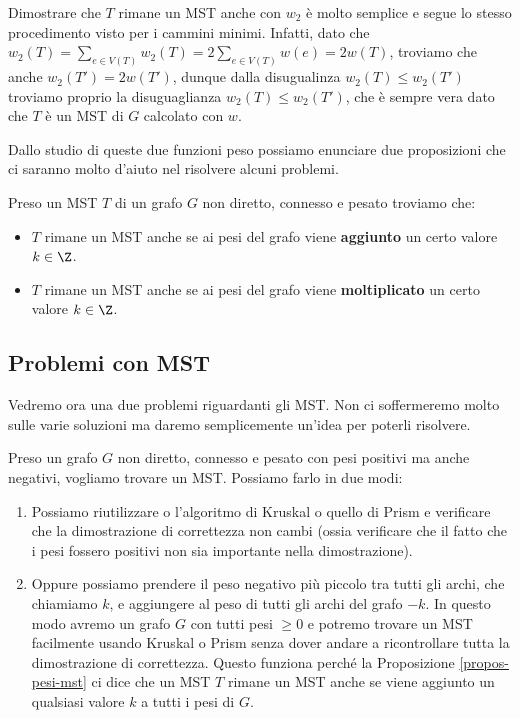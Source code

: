\documentclass[11pt, a4paper, titlepage, oneside]{scrbook}
\begin{document}
Dimostrare che $T$ rimane un MST anche con $w_2$ è molto semplice e segue lo stesso procedimento visto per i cammini minimi. Infatti, dato che $w_2(T) = \sum_{e \in V(T)} w_2(T) = 2 \sum_{e \in V(T)} w(e) = 2 w(T)$, troviamo che anche $w_2(T') = 2 w(T')$, dunque dalla disugualinza $w_2(T) \leq w_2(T')$ troviamo proprio la disuguaglianza $w_2(T) \leq w_2(T')$, che è sempre vera dato che $T$ è un MST di $G$ calcolato con $w$.

Dallo studio di queste due funzioni peso possiamo enunciare due proposizioni che ci saranno molto d'aiuto nel risolvere alcuni problemi.

\begin{Proposizione}[]
\label{propos-pesi-mst}
Preso un MST $T$ di un grafo $G$ non diretto, connesso e pesato troviamo che:
\begin{itemize}
    \item $T$ rimane un MST anche se ai pesi del grafo viene \textbf{aggiunto} un certo valore $k \in \Z$.
    \item $T$ rimane un MST anche se ai pesi del grafo viene \textbf{moltiplicato} un certo valore $k \in \Z$.
\end{itemize}
\end{Proposizione}

\subsection{Problemi con MST}

Vedremo ora una due problemi riguardanti gli MST. Non ci soffermeremo molto sulle varie soluzioni ma daremo semplicemente un'idea per poterli risolvere.

Preso un grafo $G$ non diretto, connesso e pesato con pesi positivi ma anche negativi, vogliamo trovare un MST. Possiamo farlo in due modi:
\begin{enumerate}
    \item Possiamo riutilizzare o l'algoritmo di Kruskal o quello di Prism e verificare che la dimostrazione di correttezza non cambi (ossia verificare che il fatto che i pesi fossero positivi non sia importante nella dimostrazione).
    \item Oppure possiamo prendere il peso negativo più piccolo tra tutti gli archi, che chiamiamo $k$, e aggiungere al peso di tutti gli archi del grafo $-k$. In questo modo avremo un grafo $G$ con tutti pesi $\geq 0$ e potremo trovare un MST facilmente usando Kruskal o Prism senza dover andare a ricontrollare tutta la dimostrazione di correttezza. Questo funziona perché la Proposizione \ref{propos-pesi-mst} ci dice che un MST $T$ rimane un MST anche se viene aggiunto un qualsiasi valore $k$ a tutti i pesi di $G$.
\end{enumerate}
\end{document}
